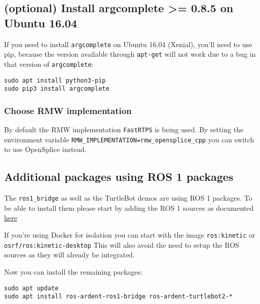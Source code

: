 \hypertarget{optional-install-argcomplete-0.8.5-on-ubuntu-16.04}{%
\subsection{(optional) Install argcomplete \textgreater= 0.8.5 on Ubuntu
16.04}\label{optional-install-argcomplete-0.8.5-on-ubuntu-16.04}}

If you need to install \texttt{argcomplete} on Ubuntu 16.04 (Xenial),
you'll need to use pip, because the version available through
\texttt{apt-get} will not work due to a bug in that version of
\texttt{argcomplete}:

\begin{verbatim}
sudo apt install python3-pip
sudo pip3 install argcomplete
\end{verbatim}

\hypertarget{choose-rmw-implementation}{%
\subsubsection{Choose RMW
implementation}\label{choose-rmw-implementation}}

By default the RMW implementation \texttt{FastRTPS} is being used. By
setting the environment variable
\texttt{RMW\_IMPLEMENTATION=rmw\_opensplice\_cpp} you can switch to use
OpenSplice instead.

\hypertarget{additional-packages-using-ros-1-packages}{%
\subsection{Additional packages using ROS 1
packages}\label{additional-packages-using-ros-1-packages}}

The \texttt{ros1\_bridge} as well as the TurtleBot demos are using ROS 1
packages. To be able to install them please start by adding the ROS 1
sources as documented
\href{http://wiki.ros.org/Installation/Ubuntu?distro=kinetic}{here}

If you're using Docker for isolation you can start with the image
\texttt{ros:kinetic} or \texttt{osrf/ros:kinetic-desktop} This will also
avoid the need to setup the ROS sources as they will already be
integrated.

Now you can install the remaining packages:

\begin{verbatim}
sudo apt update
sudo apt install ros-ardent-ros1-bridge ros-ardent-turtlebot2-*
\end{verbatim}

